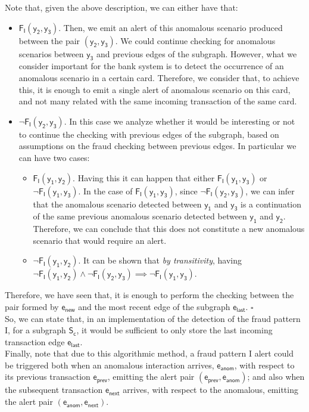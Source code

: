 Note that, given the above description, we can either have that:
\begin{itemize}
    \item $\mathsf{F_I(y_2,y_3)}$. Then, we emit an alert of this anomalous scenario produced between the pair $\mathsf{(y_2,y_3)}$. We could continue checking for anomalous scenarios between $\mathsf{y_3}$ and previous edges of the subgraph. However, what we consider important for the bank system is to detect the occurrence of an anomalous scenario in a certain card. Therefore, we consider that, to achieve this, it is enough to emit a single alert of anomalous scenario on this card, and not many related with the same incoming transaction of the same card.
    \item $\neg \mathsf{F_I(y_2,y_3)}$. In this case we analyze whether it would be interesting or not to continue the checking with previous edges of the subgraph, based on assumptions on the fraud checking between previous edges. In particular we can have two cases:
    \begin{itemize}
        \item $\mathsf{F_I(y_1,y_2)}$. Having this it can happen that either $\mathsf{F_I(y_1,y_3)}$ or $\neg \mathsf{F_I(y_1,y_3)}$. In the case of $\mathsf{F_I(y_1,y_3)}$, since $\neg \mathsf{F_I(y_2,y_3)}$, we can infer that the anomalous scenario detected between $\mathsf{y_1}$ and $\mathsf{y_3}$ is a continuation of the same previous anomalous scenario detected between $\mathsf{y_1}$ and $\mathsf{y_2}$. Therefore, we can conclude that this does not constitute a new anomalous scenario that would require an alert.
        \item $\neg \mathsf{F_I(y_1,y_2)}$. It can be shown that \emph{by transitivity}, having \\
        $\neg \mathsf{F_I(y_1,y_2)} \land \neg \mathsf{F_I(y_2,y_3)}
        \implies \neg \mathsf{F_I(y_1,y_3)}$. \\
    \end{itemize}
\end{itemize}

Therefore, we have seen that, it is enough to perform the checking between the pair formed by $\mathsf{e_{new}}$ and the most recent edge of the subgraph $\mathsf{e_{last}}$. $\square$\\


So, we can state that, in an implementation of the detection of the fraud pattern I, for a subgraph $\mathsf{S_c}$, it would be sufficient to only store the last incoming transaction edge $\mathsf{e_{last}}$.\\

Finally, note that due to this algorithmic method, a fraud pattern I alert could be triggered both when an anomalous interaction arrives, $\mathsf{e_{anom}}$, with respect to its previous transaction $\mathsf{e_{prev}}$, emitting the alert pair $\mathsf{(e_{prev}, e_{anom})}$; and also when the subsequent transaction $\mathsf{e_{next}}$ arrives, with respect to the anomalous, emitting the alert pair $\mathsf{(e_{anom}, e_{next})}$.
